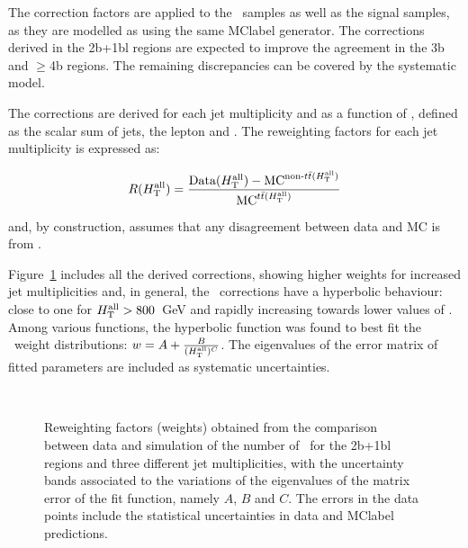 The correction factors are applied to the \ttbar\ samples as well as the signal samples, as they are modelled as using the same \acrshort{MClabel} generator. The corrections derived in the 2b+1bl regions are expected to improve the agreement in the 3b and $\geq$4b regions. The remaining discrepancies can be covered by the systematic model.

The corrections are derived for each jet multiplicity and as a function of \HTall, defined as the scalar \pT sum of jets, the lepton and \MET. The reweighting factors for each jet multiplicity is expressed as:

\begin{equation}
    \label{tqX:RWeq}
    R(H_{\text{T}}^{\text{all}})=\frac{ \text{Data}(H_{\text{T}}^{\text{all}}) - \text{MC}^{\text{non-\ensuremath{t\bar{t}}}(H_{\text{T}}^{\text{all}})} }{\text{MC}^{\text{\ensuremath{t\bar{t}}}(H_{\text{T}}^{\text{all}})}}
\end{equation}

and, by construction, assumes that any disagreement between data and MC is from \ttbar.

Figure~\ref{tqX:RWfactors} includes all the derived corrections, showing higher weights for increased jet multiplicities and, in general, the \HTall\ corrections have a hyperbolic behaviour: close to one for $H_{\text{T}}^{\text{all}} > 800$~GeV and rapidly increasing towards lower values of \HTall. Among various functions, the hyperbolic function was found to best fit the \HTall\ weight distributions: $w=A+\frac{B}{(H_{\text{T}}^{\text{all}})^C}$. The eigenvalues of the error matrix of fitted parameters are included as systematic uncertainties.

\begin{figure}[htb]
    \RawFloats
    \begin{center}
     \\
    \caption{Reweighting factors (weights) obtained from the comparison between data and simulation of the number of \HTall\ for the 2b+1bl regions and three different jet multiplicities, with the uncertainty bands associated to the variations of the eigenvalues of the matrix error of the fit function, namely $A$, $B$ and $C$. The errors in the data points include the statistical uncertainties in data and \acrshort{MClabel} predictions.}
    \label{tqX:RWfactors}
\end{center}
\end{figure}


